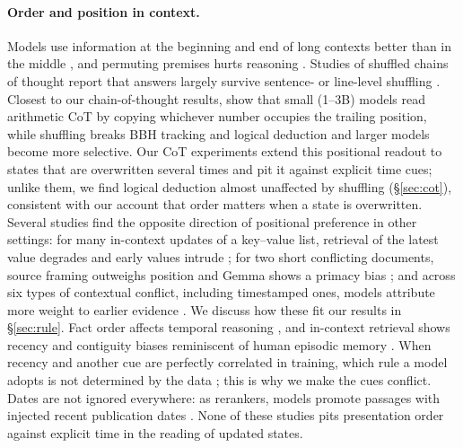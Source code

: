 \documentclass[11pt]{article}
\begin{document}
\paragraph{Order and position in context.}
Models use information at the beginning and end of long contexts better than in the middle \citep{liu2024lost}, and permuting premises hurts reasoning \citep{chen2024premise}.
Studies of shuffled chains of thought report that answers largely survive sentence- or line-level shuffling \citep{lca2026,cotorder2026a}. Closest to our chain-of-thought results, \citet{cotorder2026b} show that small (1--3B) models read arithmetic CoT by copying whichever number occupies the trailing position, while shuffling breaks BBH tracking and logical deduction and larger models become more selective. Our CoT experiments extend this positional readout to states that are overwritten several times and pit it against explicit time cues; unlike them, we find logical deduction almost unaffected by shuffling (\S\ref{sec:cot}), consistent with our account that order matters when a state is overwritten.
Several studies find the opposite direction of positional preference in other settings: for many in-context updates of a key--value list, retrieval of the latest value degrades and early values intrude \citep{qiao2026retrieval,chattaraj2026first}; for two short conflicting documents, source framing outweighs position and Gemma shows a primacy bias \citep{fitch2026gemma}; and across six types of contextual conflict, including timestamped ones, models attribute more weight to earlier evidence \citep{yang2026contextconflict}. We discuss how these fit our results in \S\ref{sec:rule}.
Fact order affects temporal reasoning \citep{fatemi2024tot}, and in-context retrieval shows recency and contiguity biases reminiscent of human episodic memory \citep{temporalbias2025}. When recency and another cue are perfectly correlated in training, which rule a model adopts is not determined by the data \citep{liao2026shortcut}; this is why we make the cues conflict.
Dates are not ignored everywhere: as rerankers, models promote passages with injected recent publication dates \citep{fang2025recency}. None of these studies pits presentation order against explicit time in the reading of updated states.
\end{document}
